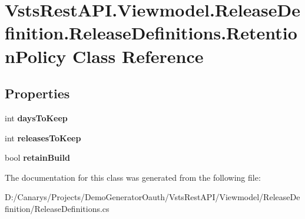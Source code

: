 \hypertarget{class_vsts_rest_a_p_i_1_1_viewmodel_1_1_release_definition_1_1_release_definitions_1_1_retention_policy}{}\section{Vsts\+Rest\+A\+P\+I.\+Viewmodel.\+Release\+Definition.\+Release\+Definitions.\+Retention\+Policy Class Reference}
\label{class_vsts_rest_a_p_i_1_1_viewmodel_1_1_release_definition_1_1_release_definitions_1_1_retention_policy}
\subsection*{Properties}
\begin{DoxyCompactItemize}
\item 
\mbox{\label{class_vsts_rest_a_p_i_1_1_viewmodel_1_1_release_definition_1_1_release_definitions_1_1_retention_policy_a8c085c8b875e35b97474acdad27cf7ad}} 
int {\bfseries days\+To\+Keep}
\item 
\mbox{\label{class_vsts_rest_a_p_i_1_1_viewmodel_1_1_release_definition_1_1_release_definitions_1_1_retention_policy_aab6fc1ef4c3ef032a4c563df4243a787}} 
int {\bfseries releases\+To\+Keep}
\item 
\mbox{\label{class_vsts_rest_a_p_i_1_1_viewmodel_1_1_release_definition_1_1_release_definitions_1_1_retention_policy_a74fd0bb978ac1ae5d4564736abde762a}} 
bool {\bfseries retain\+Build}
\end{DoxyCompactItemize}


The documentation for this class was generated from the following file\+:\begin{DoxyCompactItemize}
\item 
D\+:/\+Canarys/\+Projects/\+Demo\+Generator\+Oauth/\+Vsts\+Rest\+A\+P\+I/\+Viewmodel/\+Release\+Definition/Release\+Definitions.\+cs\end{DoxyCompactItemize}
